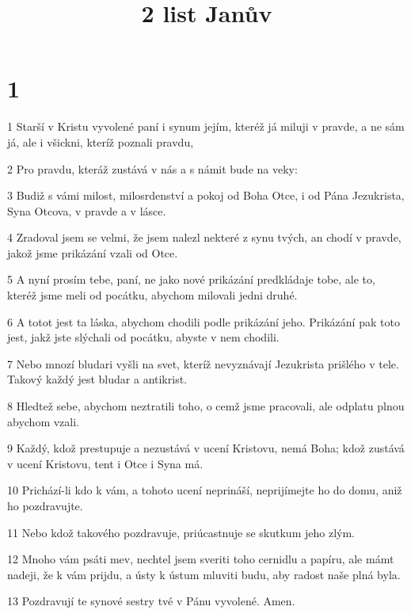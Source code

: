 

\title{2 list Janův}

\chapter{1}

\par 1 Starší v Kristu vyvolené paní i synum jejím, kteréž já miluji v pravde, a ne sám já, ale i všickni, kteríž poznali pravdu,
\par 2 Pro pravdu, kteráž zustává v nás a s námit bude na veky:
\par 3 Budiž s vámi milost, milosrdenství a pokoj od Boha Otce, i od Pána Jezukrista, Syna Otcova, v pravde a v lásce.
\par 4 Zradoval jsem se velmi, že jsem nalezl nekteré z synu tvých, an chodí v pravde, jakož jsme prikázání vzali od Otce.
\par 5 A nyní prosím tebe, paní, ne jako nové prikázání predkládaje tobe, ale to, kteréž jsme meli od pocátku, abychom milovali jedni druhé.
\par 6 A totot jest ta láska, abychom chodili podle prikázání jeho. Prikázání pak toto jest, jakž jste slýchali od pocátku, abyste v nem chodili.
\par 7 Nebo mnozí bludari vyšli na svet, kteríž nevyznávají Jezukrista prišlého v tele. Takový každý jest bludar a antikrist.
\par 8 Hledtež sebe, abychom neztratili toho, o cemž jsme pracovali, ale odplatu plnou abychom vzali.
\par 9 Každý, kdož prestupuje a nezustává v ucení Kristovu, nemá Boha; kdož zustává v ucení Kristovu, tent i Otce i Syna má.
\par 10 Prichází-li kdo k vám, a tohoto ucení neprináší, neprijímejte ho do domu, aniž ho pozdravujte.
\par 11 Nebo kdož takového pozdravuje, priúcastnuje se skutkum jeho zlým.
\par 12 Mnoho vám psáti mev, nechtel jsem sveriti toho cernidlu a papíru, ale mámt nadeji, že k vám prijdu, a ústy k ústum mluviti budu, aby radost naše plná byla.
\par 13 Pozdravují te synové sestry tvé v Pánu vyvolené. Amen.



